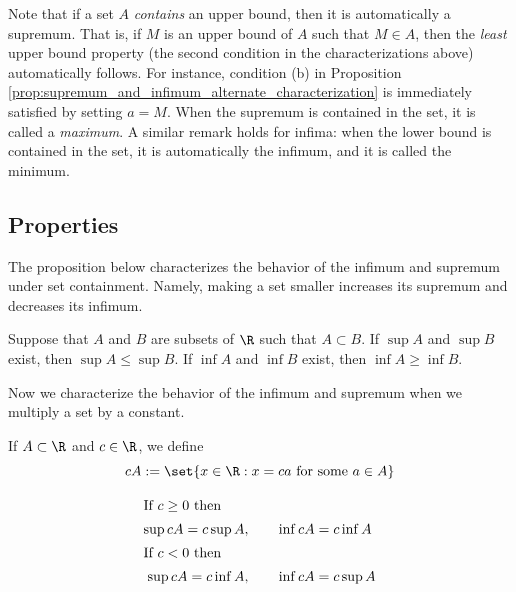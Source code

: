 \documentclass{article} %
\begin{document}
\begin{remark}{}
Note that if a set $A$ \textit{contains} an upper bound, then it is automatically a supremum.  That is, if $M$ is an upper bound of $A$ such that $M \in A$, then the \textit{least} upper bound property (the second condition in the characterizations above) automatically follows.  For instance, condition (b) in Proposition \ref{prop:supremum_and_infimum_alternate_characterization} is immediately satisfied by setting $a=M$.   When the supremum is contained in the set, it is called a \textit{maximum}.   A similar remark holds for infima: when the lower bound is contained in the set, it is automatically the infimum, and it is called the minimum.
\label{rk:when_upper_or_lower_bound_is_contained_in_the_set_itself} 
\end{remark}

\subsection{Properties}

The proposition below characterizes the behavior of the infimum and supremum under set containment. Namely, making a set smaller increases its supremum and decreases its infimum. 

\begin{proposition}
Suppose that $A$ and $B$ are subsets of $\R$ such that $A \subset B$.  If $\sup A$ and $\sup B$ exist, then $\sup A \leq \sup B$.  If $\inf A$ and $\inf B$ exist, then $\inf A \geq \inf B$.
\label{prop:sup_and_inf_for_subsets_are_tighter}
\end{proposition}

Now we characterize the behavior of the infimum and supremum when we multiply a set by a constant.

\begin{definition}
If $A \subset \R$ and $c \in \R$, we define
\[ cA := \set{x \in \R : x = ca \text{ for some } a \in A}\]	
\end{definition}

\begin{proposition}

\begin{align*}
\intertext{If $c \geq 0$ then} 
\sup cA = c \sup A, &\quad \quad \inf cA = c \inf A\\
\intertext{If $c < 0$ then} 
\sup cA = c \inf A, &\quad \quad \inf cA = c \sup A\\
\end{align*}
\label{prop:supremum_and_infimum_under_constant_multiples_of_sets}
\end{proposition}
\end{document}
